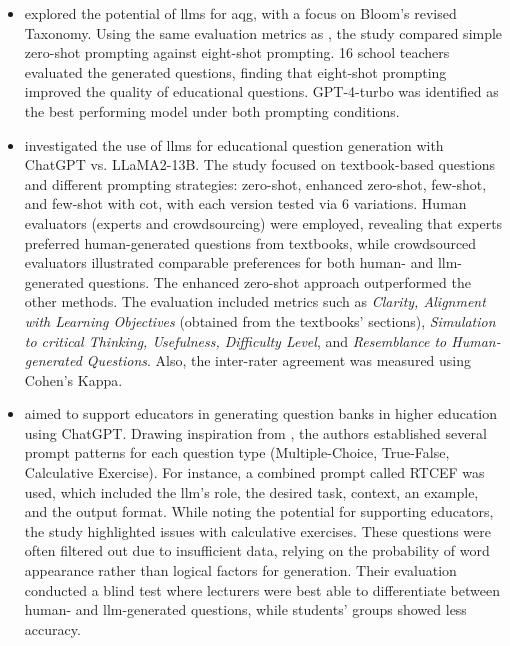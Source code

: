 \begin{itemize}
    \item \cite{maity_can_2025} explored the potential of \ac{llms} for \ac{aqg}, with a focus on Bloom's revised Taxonomy. Using the same evaluation metrics as \cite{elkins_how_2023}, the study compared simple zero-shot prompting against eight-shot prompting. 16 school teachers evaluated the generated questions, finding that eight-shot prompting improved the quality of educational questions. GPT-4-turbo was identified as the best performing model under both prompting conditions. 
    \item \cite{al_faraby_analysis_2024} investigated the use of \ac{llms} for educational question generation with ChatGPT vs. LLaMA2-13B. The study focused on textbook-based questions and different prompting strategies: zero-shot, enhanced zero-shot, few-shot, and few-shot with \ac{cot}, with each version tested via 6 variations. Human evaluators (experts and crowdsourcing) were employed, revealing that experts preferred human-generated questions from textbooks, while crowdsourced evaluators illustrated comparable preferences for both human- and \ac{llm}-generated questions. The enhanced zero-shot approach outperformed the other methods. The evaluation included metrics such as \textit{Clarity, Alignment with Learning Objectives} (obtained from the textbooks' sections), \textit{Simulation to critical Thinking, Usefulness, Difficulty Level}, and \textit{Resemblance to Human-generated Questions}. Also, the inter-rater agreement was measured using Cohen's Kappa.
    \vspace{9em}\pagebreak
    \item \cite{vu_chatgpt-based_2024} aimed to support educators in generating question banks in higher education using ChatGPT. Drawing inspiration from \cite{cavojsky_exploring_2023}, the authors established several prompt patterns for each question type (Multiple-Choice, True-False, Calculative Exercise). For instance, a combined prompt called RTCEF was used, which included the \ac{llm}'s role, the desired task, context, an example, and the output format. While noting the potential for supporting educators, the study highlighted issues with calculative exercises. These questions were often filtered out due to insufficient data, relying on the probability of word appearance rather than logical factors for generation. Their evaluation conducted a blind test where lecturers were best able to differentiate between human- and \ac{llm}-generated questions, while students' groups showed less accuracy.
\end{itemize}

